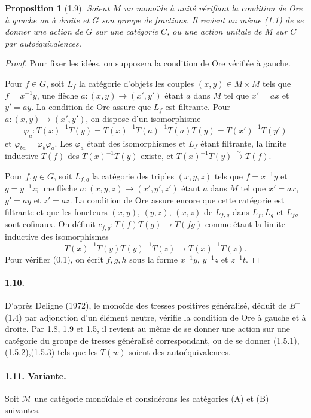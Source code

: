 \documentclass[11pt]{article}
\newcommand{\calM}{\mathcal M}
\newtheorem{proposition}[theorem]{Proposition}
\begin{document}
\begin{proposition}[1.9]
Soient $M$ un monoïde à unité vérifiant la condition de Ore à gauche ou à droite et $G$ son groupe de fractions. Il revient au même (1.1) de se donner une action de $G$ sur une catégorie $C$, ou une action unitale de $M$ sur $C$ par autoéquivalences.
\end{proposition}
\begin{proof}
Pour fixer les idées, on supposera la condition de Ore vérifiée à gauche.

Pour $f\in G$, soit $L_f$ la catégorie d'objets les couples $(x,y)\in M\times M$ tels que $f=x^{-1}y$, une flèche $a:(x,y)\to(x',y')$ étant $a$ dans $M$ tel que $x'=ax$ et $y'=ay$. La condition de Ore assure que $L_f$ est filtrante. Pour $a:(x,y)\to(x',y')$, on dispose d'un isomorphisme
\[
 \varphi_a:T(x)^{-1}T(y)=T(x)^{-1}T(a)^{-1}T(a)T(y)=T(x')^{-1}T(y')
\]
et $\varphi_{ba}=\varphi_b\varphi_a$. Les $\varphi_a$ étant des isomorphismes et $L_f$ étant filtrante, la limite inductive $T(f)$ des $T(x)^{-1}T(y)$ existe, et $T(x)^{-1}T(y)\xrightarrow{\sim}T(f)$.

Pour $f,g\in G$, soit $L_{f,g}$ la catégorie des triples $(x,y,z)$ tels que $f=x^{-1}y$ et $g=y^{-1}z$; une flèche $a:(x,y,z)\to(x',y',z')$ étant $a$ dans $M$ tel que $x'=ax$, $y'=ay$ et $z'=az$. La condition de Ore assure encore que cette catégorie est filtrante et que les foncteurs $(x,y)$, $(y,z)$, $(x,z)$ de $L_{f,g}$ dans $L_f,L_g$ et $L_{fg}$ sont cofinaux. On définit $c_{f,g}:T(f)T(g)\to T(fg)$ comme étant la limite inductive des isomorphismes
\[
 T(x)^{-1}T(y)T(y)^{-1}T(z)\longrightarrow T(x)^{-1}T(z).
\]
Pour vérifier (0.1), on écrit $f,g,h$ sous la forme $x^{-1}y$, $y^{-1}z$ et $z^{-1}t$.
\end{proof}

\paragraph{1.10.} D'après Deligne (1972), le monoïde des tresses positives généralisé, déduit de $B^+$ (1.4) par adjonction d'un élément neutre, vérifie la condition de Ore à gauche et à droite. Par 1.8, 1.9 et 1.5, il revient au même de se donner une action sur une catégorie du groupe de tresses généralisé correspondant, ou de se donner (1.5.1),(1.5.2),(1.5.3) tels que les $T(w)$ soient des autoéquivalences.

\paragraph{1.11. Variante.} Soit $\calM$ une catégorie monoïdale et considérons les catégories (A) et (B) suivantes.
\end{document}
